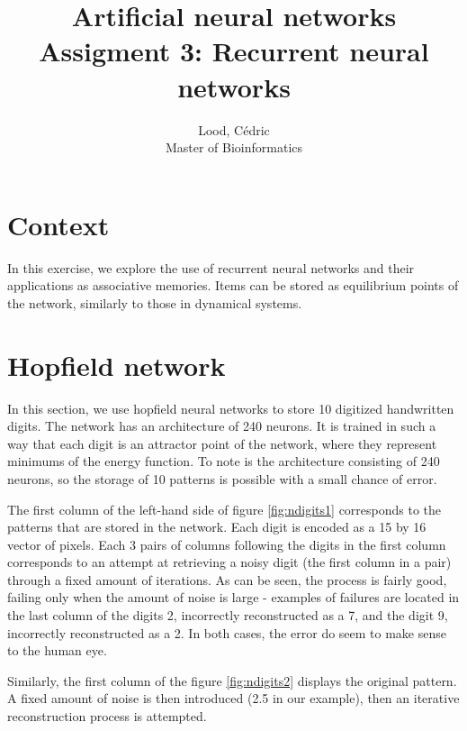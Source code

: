 \documentclass[11pt, a4paper]{article}
\title{ \huge Artificial neural networks \\ 
  { \large Assigment 3: Recurrent neural networks }}
\author{
        Lood, Cédric \\
        \small Master of Bioinformatics
}
\begin{document}
\maketitle

\section{Context}
In this exercise, we explore the use of recurrent neural networks and
their applications as associative memories. Items can be stored as
equilibrium points of the network, similarly to those in dynamical
systems.

\section{Hopfield network}

In this section, we use hopfield neural networks to store 10 digitized
handwritten digits. The network has an architecture of 240 neurons. It
is trained in such a way that each digit is an attractor point of the
network, where they represent minimums of the energy function. To note
is the architecture consisting of 240 neurons, so the storage of 10
patterns is possible with a small chance of error.

The first column of the left-hand side of figure \ref{fig:ndigits1}
corresponds to the patterns that are stored in the network. Each digit
is encoded as a 15 by 16 vector of pixels. Each 3 pairs of columns
following the digits in the first column corresponds to an attempt at
retrieving a noisy digit (the first column in a pair) through a fixed
amount of iterations. As can be seen, the process is fairly good,
failing only when the amount of noise is large - examples of failures
are located in the last column of the digits 2, incorrectly
reconstructed as a 7, and the digit 9, incorrectly reconstructed as a
2. In both cases, the error do seem to make sense to the human eye.

Similarly, the first column of the figure \ref{fig:ndigits2} displays
the original pattern. A fixed amount of noise is then introduced (2.5
in our example), then an iterative reconstruction process is
attempted.
\end{document}
